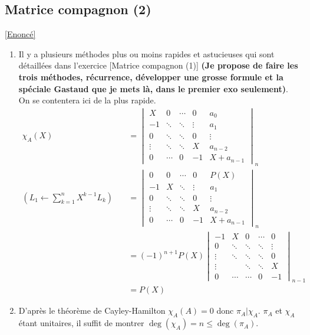 \documentclass[8pt]{book}
\begin{document}
	\subsection{Matrice compagnon (2)}
	\label{Matrice compagnon (2) corrigé}
	\textcolor{blue}{\hyperref[Matrice compagnon (2)]{[Enoncé]}}\\
	\begin{enumerate}
		\item Il y a plusieurs méthodes plus ou moins rapides et astucieuses qui sont détaillées dans l'exercice [Matrice compagnon (1)] \textbf{(Je propose de faire les trois méthodes, récurrence, développer une grosse formule et la spéciale Gastaud que je mets là, dans le premier exo seulement)}. On se contentera ici de la plus rapide.\\
		\begin{align*}
			\chi_A(X)&=\begin{vmatrix}
				X&0&\cdots&0&a_0\\
				-1&\ddots&\ddots&\vdots&a_1\\
				0&\ddots&\ddots&0&\vdots\\
				\vdots&\ddots&\ddots&X&a_{n-2}\\
				0&\cdots&0&-1&X+a_{n-1}
			\end{vmatrix}_n\\
			\left(L_1\leftarrow\displaystyle\sum_{k=1}^nX^{k-1}L_k\right)\quad&=\begin{vmatrix}
				0&0&\cdots&0&P(X)\\
				-1&X&\ddots&\vdots&a_1\\
				0&\ddots&\ddots&0&\vdots\\
				\vdots&\ddots&\ddots&X&a_{n-2}\\
				0&\cdots&0&-1&X+a_{n-1}
			\end{vmatrix}_n\\
			&=(-1)^{n+1}P(X)\begin{vmatrix}
				-1&X&0&\cdots&0\\
				0&\ddots&\ddots&\ddots&\vdots\\
				\vdots&\ddots&\ddots&\ddots&0\\
				\vdots&&\ddots&\ddots&X\\
				0&\cdots&\cdots&0&-1
			\end{vmatrix}_{n-1}\\
			&=P(X)
		\end{align*}
		\item D'après le théorème de Cayley-Hamilton $\chi_A(A)=0$ donc $\pi_A|\chi_A$. $\pi_A$ et $\chi_A$ étant unitaires, il suffit de montrer $\deg(\chi_A)=n\leq \deg(\pi_A)$.

\end{enumerate}
\end{document}
